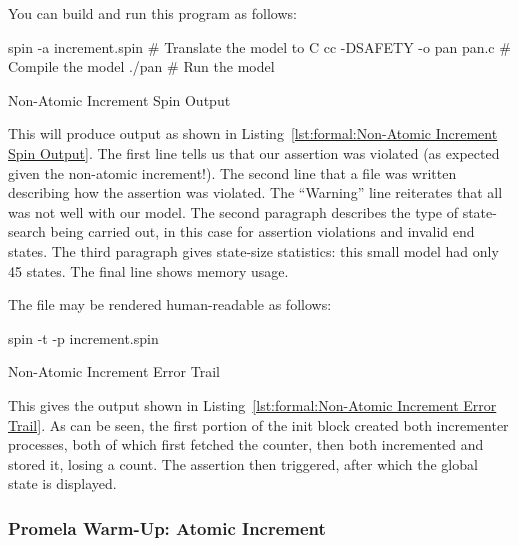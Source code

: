 You can build and run this program as follows:

\begin{VerbatimU}
spin -a increment.spin      # Translate the model to C
cc -DSAFETY -o pan pan.c    # Compile the model
./pan                       # Run the model
\end{VerbatimU}

\begin{listing}[tbp]
\vspace*{-9pt}
\caption{Non-Atomic Increment Spin Output}
\label{lst:formal:Non-Atomic Increment Spin Output}
\end{listing}

This will produce output as shown in
Listing~\ref{lst:formal:Non-Atomic Increment Spin Output}.
The first line tells us that our assertion was violated (as expected
given the non-atomic increment!).
The second line that a  file was written describing how the
assertion was violated.
The ``Warning'' line reiterates that all was not well with our model.
The second paragraph describes the type of state-search being carried out,
in this case for assertion violations and invalid end states.
The third paragraph gives state-size statistics: this small model had only
45 states.
The final line shows memory usage.

The  file may be rendered human-readable as follows:

\begin{VerbatimU}
spin -t -p increment.spin
\end{VerbatimU}

\begin{listing*}[htbp]
\vspace*{-9pt}
\caption{Non-Atomic Increment Error Trail}
\label{lst:formal:Non-Atomic Increment Error Trail}
\end{listing*}

This gives the output shown in
Listing~\ref{lst:formal:Non-Atomic Increment Error Trail}.
As can be seen, the first portion of the init block created both
incrementer processes, both of which first fetched the counter,
then both incremented and stored it, losing a count.
The assertion then triggered, after which the global state is displayed.

\subsubsection{Promela Warm-Up: Atomic Increment}
\label{sec:formal:Promela Warm-Up: Atomic Increment}
\NoIndentAfterThis

